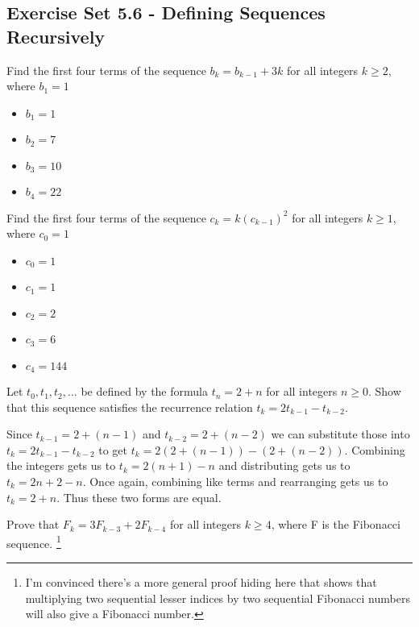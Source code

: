\documentclass[12pt]{article}
\newenvironment{modenumerate}
  {\enumerate\setupmodenumerate}
  {\endenumerate}
\newif\ifmoditem
\newcommand{\setupmodenumerate}{%
  \global\moditemfalse
  \let\origmakelabel\makelabel
  \def\moditem##1{\global\moditemtrue\def\mesymbol{##1}\item}%
  \def\makelabel##1{%
    \origmakelabel{##1\ifmoditem\rlap{\mesymbol}\fi\enspace}%
    \global\moditemfalse}%
}
\begin{document}
\setcounter{section}{5}
\subsection{Exercise Set 5.6 - Defining Sequences Recursively}
\begin{modenumerate}

\setcounter{enumi}{1}
\item %
Find the first four terms of the sequence $b_{k} = b_{k-1} + 3k$ for all integers $k \geq 2$, where $b_{1} =
1$
\begin{itemize}
\item $b_{1} = 1$
\item $b_{2} = 7$
\item $b_{3} = 10$
\item $b_{4} = 22$
\end{itemize}

\item %
Find the first four terms of the sequence $c_{k} = k(c_{k-1})^{2}$ for all integers $k \geq 1$, where
$c_{0}=1$
\begin{itemize}
\item $c_{0} = 1$
\item $c_{1} = 1$
\item $c_{2} = 2$
\item $c_{3} = 6$
\item $c_{4} = 144$
\end{itemize}

\setcounter{enumi}{12}
\item %

Let $t_{0},t_{1},t_{2},...$ be defined by the formula $t_{n}=2+n$ for all integers $n \geq 0$. Show that this
sequence satisfies the recurrence relation $t_{k}=2t_{k-1}-t_{k-2}$.

Since $t_{k-1}=2+(n-1)$ and $t_{k-2}=2+(n-2)$ we can substitute those into $t_{k}=2t_{k-1}-t_{k-2}$ to get
$t_{k} = 2(2+(n-1)) - (2+(n-2))$. Combining the integers gets us to $t_{k} = 2(n+1) - n$ and distributing gets
us to $t_{k} = 2n+2 - n$. Once again, combining like terms and rearranging gets us to $t_{k} = 2+n$. Thus
these two forms are equal.

\setcounter{enumi}{25}
\item %
  Prove that $F_{k}=3F_{k-3}+2F_{k-4}$ for all integers $k\geq 4$, where F is the Fibonacci sequence.
  \footnote{I'm convinced there's a more general proof hiding here that shows that multiplying two sequential
    lesser indices by two sequential Fibonacci numbers will also give a Fibonacci number.}


\end{modenumerate}
\end{document}

